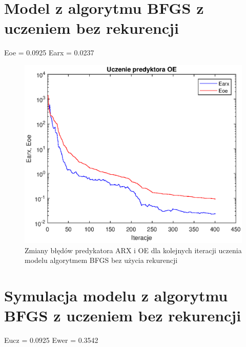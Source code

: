 		\newpage
	\section{Model z algorytmu BFGS z uczeniem bez rekurencji}
		\label{sec:bfgs_arx}
		Eoe = 0.0925
		Earx = 0.0237
		
		\begin{figure}[h!]
			\centering
			\includegraphics[width=\linewidth]{img/BFGS_ARX_p.eps}
			\caption{Zmiany błędów predykatora ARX i OE dla kolejnych iteracji uczenia modelu algorytmem BFGS bez użycia rekurencji}
			\label{fig:bfgs_arx_p}
		\end{figure}
		
		\newpage
	\section{Symulacja modelu z algorytmu BFGS z uczeniem bez rekurencji}
		\label{sec:bfgs_arx_sym}
		Eucz = 0.0925
		Ewer = 0.3542
		

